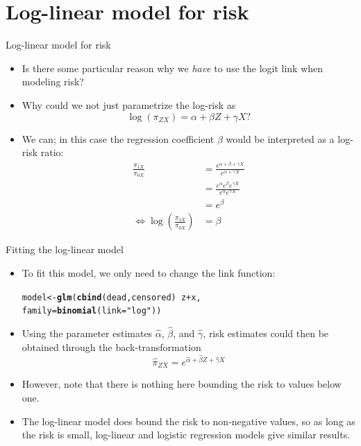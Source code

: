 \documentclass[10pt,handout]{beamer}\usepackage[]{graphicx}\usepackage[]{color}
\makeatletter
\newcommand{\hlstr}[1]{\textcolor[rgb]{0.192,0.494,0.8}{#1}}%
\newcommand{\hlopt}[1]{\textcolor[rgb]{0,0,0}{#1}}%
\newcommand{\hlstd}[1]{\textcolor[rgb]{0.345,0.345,0.345}{#1}}%
\newcommand{\hlkwb}[1]{\textcolor[rgb]{0.69,0.353,0.396}{#1}}%
\newcommand{\hlkwc}[1]{\textcolor[rgb]{0.333,0.667,0.333}{#1}}%
\newcommand{\hlkwd}[1]{\textcolor[rgb]{0.737,0.353,0.396}{\textbf{#1}}}%
\newenvironment{kframe}{%
 \def\at@end@of@kframe{}%
 \ifinner\ifhmode%
  \def\at@end@of@kframe{\end{minipage}}%
  \begin{minipage}{\columnwidth}%
 \fi\fi%
 \def\FrameCommand##1{\hskip\@totalleftmargin \hskip-\fboxsep
 \colorbox{shadecolor}{##1}\hskip-\fboxsep
     \hskip-\linewidth \hskip-\@totalleftmargin \hskip\columnwidth}%
 \MakeFramed {\advance\hsize-\width
   \@totalleftmargin\z@ \linewidth\hsize
   \@setminipage}}%
 {\par\unskip\endMakeFramed%
 \at@end@of@kframe}
\newenvironment{knitrout}{}{} %
\makeatother
\begin{document}
\section{Log-linear model for risk}

\begin{frame}[fragile]{Log-linear model for risk}
	\begin{itemize}
		\item Is there some particular reason why we \textit{have} to use the logit link when modeling risk?
		\item Why could we not just parametrize the log-risk as
		$$
		\log(\pi_{ZX}) = \alpha + \beta Z + \gamma X ?
		$$
		\pause 
		\item We can; in this case the regression coefficient $\beta$ would be interpreted as a log-risk ratio:
$$\begin{aligned}
	\frac{\pi_{1 X}}{\pi_{0 X}} &=\frac{e^{\alpha+\beta+\gamma X}}{e^{\alpha+\gamma X}} \\
	&=\frac{e^{\alpha} e^{\beta} e^{\gamma X}}{e^{\alpha} e^{\gamma X}} \\
	&=e^{\beta} \\
	\Leftrightarrow \log \left(\frac{\pi_{1 X}}{\pi_{0 X}}\right) &=\beta
\end{aligned}$$
	\end{itemize}
\end{frame}




\begin{frame}[fragile]{Fitting the log-linear model}
\begin{itemize}
	\item To fit this model, we only need to change the link
	function:
\begin{knitrout}
\color{fgcolor}\begin{kframe}
\begin{alltt}
        \hlstd{model} \hlkwb{<-} \hlkwd{glm}\hlstd{(}\hlkwd{cbind}\hlstd{(dead,censored)} \hlopt{~} \hlstd{z} \hlopt{+} \hlstd{x,}
                     \hlkwc{family}\hlstd{=}\hlkwd{binomial}\hlstd{(}\hlkwc{link}\hlstd{=}\hlstr{"log"}\hlstd{))}
\end{alltt}
\end{kframe}
\end{knitrout}
	\item Using the parameter estimates $\hat{\alpha}$, $\hat{\beta}$, and $\hat{\gamma}$, risk estimates could then be obtained through the back-transformation
	$$
	\hat{\pi}_{ZX} = e^{\hat{\alpha} + \hat{\beta} Z + \hat{\gamma} X}
	$$
	\item However, note that there is nothing here bounding the risk
	to values below one.
	\item The log-linear model does bound the risk to non-negative
	values, so as long as the risk is small, log-linear and
	logistic regression models give similar results.
\end{itemize}
\end{frame}
\end{document}
